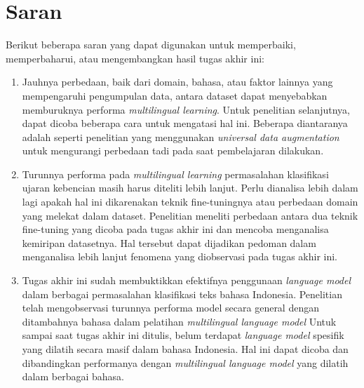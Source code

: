 \section{Saran}
Berikut beberapa saran yang dapat digunakan untuk memperbaiki, memperbaharui, atau mengembangkan hasil tugas akhir ini:
\begin{enumerate}
    \item Jauhnya perbedaan, baik dari domain, bahasa, atau faktor lainnya yang mempengaruhi pengumpulan data, antara dataset dapat menyebabkan memburuknya performa \textit{multilingual learning}. Untuk penelitian selanjutnya, dapat dicoba beberapa cara untuk mengatasi hal ini. Beberapa diantaranya adalah seperti penelitian \parencite{Lai_Oguz_Yang_Stoyanov_2019} yang menggunakan \textit{universal data augmentation} untuk mengurangi perbedaan tadi pada saat pembelajaran dilakukan.
    \item Turunnya performa pada \textit{multilingual learning} permasalahan klasifikasi ujaran kebencian masih harus diteliti lebih lanjut. Perlu dianalisa lebih dalam lagi apakah hal ini dikarenakan teknik fine-tuningnya atau perbedaan domain yang melekat dalam dataset. Penelitian \parencite{Peters_Ruder_Smith_2019} meneliti perbedaan antara dua teknik fine-tuning yang dicoba pada tugas akhir ini dan mencoba menganalisa kemiripan datasetnya. Hal tersebut dapat dijadikan pedoman dalam menganalisa lebih lanjut fenomena yang diobservasi pada tugas akhir ini.
    \item Tugas akhir ini sudah membuktikkan efektifnya penggunaan \textit{language model} dalam berbagai permasalahan klasifikasi teks bahasa Indonesia. Penelitian \parencite{Conneau_XLMR} telah mengobservasi turunnya performa model secara general dengan ditambahnya bahasa dalam pelatihan \textit{multilingual language model} Untuk sampai saat tugas akhir ini ditulis, belum terdapat \textit{language model} spesifik yang dilatih secara masif dalam bahasa Indonesia. Hal ini dapat dicoba dan dibandingkan performanya dengan \textit{multilingual language model} yang dilatih dalam berbagai bahasa. 
\end{enumerate}